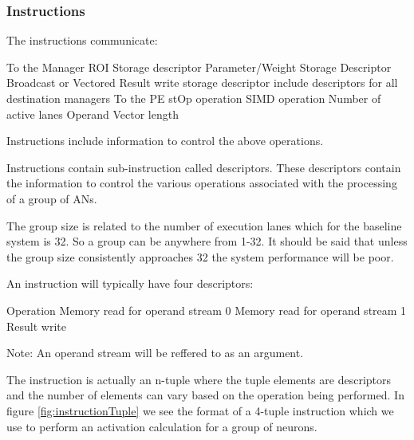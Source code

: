 \documentclass[journal]{IEEEtran}
\begin{document}
\subsubsection{Instructions}
\label{ssec:Instructions}
The instructions communicate:

\begin{outline}
        \1 To the Manager
            \2 ROI Storage descriptor
            \2 Parameter/Weight Storage Descriptor
                \3 Broadcast or Vectored
            \2 Result write storage descriptor
                \3 include descriptors for all destination managers
        \1 To the PE
            \2 stOp operation
            \2 SIMD operation
            \2 Number of active lanes
            \2 Operand Vector length
\end{outline}

Instructions include information to control the above operations.

Instructions contain sub-instruction called descriptors. These descriptors contain the information to control the various operations associated with the processing of a group of ANs.

The group size is related to the number of execution lanes which for the baseline system is 32. So a group can be anywhere from 1-32. It should be said that unless the group size consistently approaches 32 the system performance will be poor.

An instruction will typically have four descriptors:

\begin{outline}
\renewcommand{\outlinei}{enumerate}
    \1 Operation
    \1 Memory read for operand stream 0
    \1 Memory read for operand stream 1
    \1 Result write
\end{outline}

Note: An operand stream will be reffered to as an argument.

The instruction is actually an n-tuple where the tuple elements are descriptors and the number of elements can vary based on the operation being performed. In figure \ref{fig:instructionTuple} we see the format of a 4-tuple instruction which we use to perform an activation calculation for a group of neurons.
\end{document}
